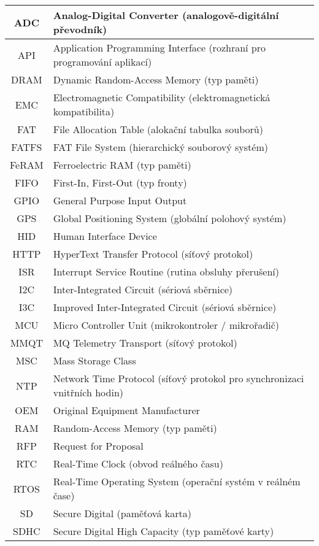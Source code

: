 \begin{longtable}{|c|l|}
ADC  & Analog-Digital Converter (analogově-digitální převodník) \\ \hline
API  & Application Programming Interface (rozhraní pro programování aplikací) \\ \hline
DRAM & Dynamic Random-Access Memory (typ paměti) \\ \hline
EMC  & Electromagnetic Compatibility (elektromagnetická kompatibilita) \\ \hline
FAT  & File Allocation Table (alokační tabulka souborů) \\ \hline
FATFS & FAT File System (hierarchický souborový systém) \\ \hline
FeRAM & Ferroelectric RAM (typ paměti) \\ \hline
FIFO & First-In, First-Out (typ fronty) \\ \hline
GPIO & General Purpose Input Output \\ \hline
GPS  & Global Positioning System (globální polohový systém) \\ \hline
HID  & Human Interface Device \\ \hline
HTTP & HyperText Transfer Protocol (síťový protokol) \\ \hline
ISR  & Interrupt Service Routine (rutina obsluhy přerušení) \\ \hline
I2C  & Inter-Integrated Circuit (sériová sběrnice) \\ \hline
I3C  & Improved Inter-Integrated Circuit (sériová sběrnice) \\ \hline
MCU  & Micro Controller Unit (mikrokontroler / mikrořadič) \\ \hline
MMQT & MQ Telemetry Transport (síťový protokol) \\ \hline
MSC  & Mass Storage Class \\ \hline
NTP  & Network Time Protocol (síťový protokol pro synchronizaci vnitřních hodin) \\ \hline
OEM  & Original Equipment Manufacturer \\ \hline
RAM  & Random-Access Memory (typ paměti) \\ \hline
RFP  & Request for Proposal \\ \hline
RTC  & Real-Time Clock (obvod reálného času) \\ \hline
RTOS & Real-Time Operating System (operační systém v reálném čase) \\ \hline
SD   & Secure Digital (paměťová karta) \\ \hline
SDHC & Secure Digital High Capacity (typ paměťové karty) \\ \hline

\end{longtable}

